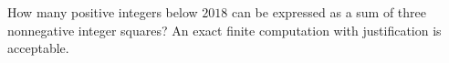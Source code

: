 How many positive integers below $2018$ can be expressed as a sum of three nonnegative integer squares? An exact finite computation with justification is acceptable.
